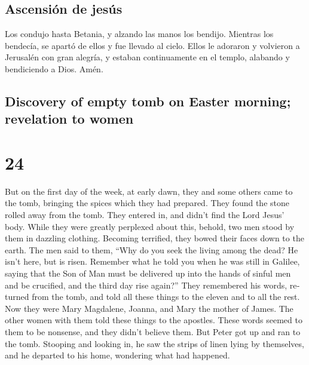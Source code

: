 \begin{paracol}{2}
\begin{otherlanguage}{english}
\hypertarget{ascensiuxf3n-de-jesuxfas}{%
\subsection{Ascensión de jesús}\label{ascensiuxf3n-de-jesuxfas}}

 Los condujo hasta Betania, y alzando las manos los
bendijo.  Mientras los bendecía, se apartó de ellos y fue
llevado al cielo.  Ellos le adoraron y volvieron a
Jerusalén con gran alegría,  y estaban continuamente en
el templo, alabando y bendiciendo a Dios. Amén. \switchcolumn
\begin{otherlanguage}{english}

\hypertarget{discovery-of-empty-tomb-on-easter-morning-revelation-to-women}{%
\subsection{Discovery of empty tomb on Easter morning; revelation to
women}\label{discovery-of-empty-tomb-on-easter-morning-revelation-to-women}}

\hypertarget{section-30}{%
\section{24}\label{section-30}}

 But on the first day of the week, at early dawn, they and
some others came to the tomb, bringing the spices which they had
prepared.  They found the stone rolled away from the tomb.
 They entered in, and didn't find the Lord Jesus' body.
 While they were greatly perplexed about this, behold, two
men stood by them in dazzling clothing.  Becoming
terrified, they bowed their faces down to the earth. The men said to
them, ``Why do you seek the living among the dead?  He
isn't here, but is risen. Remember what he told you when he was still in
Galilee,  saying that the Son of Man must be delivered up
into the hands of sinful men and be crucified, and the third day rise
again?''  They remembered his words, 
returned from the tomb, and told all these things to the eleven and to
all the rest.  Now they were Mary Magdalene, Joanna, and
Mary the mother of James. The other women with them told these things to
the apostles.  These words seemed to them to be nonsense,
and they didn't believe them.  But Peter got up and ran
to the tomb. Stooping and looking in, he saw the strips of linen lying
by themselves, and he departed to his home, wondering what had happened.


\end{otherlanguage}
\end{otherlanguage}
\end{paracol}
